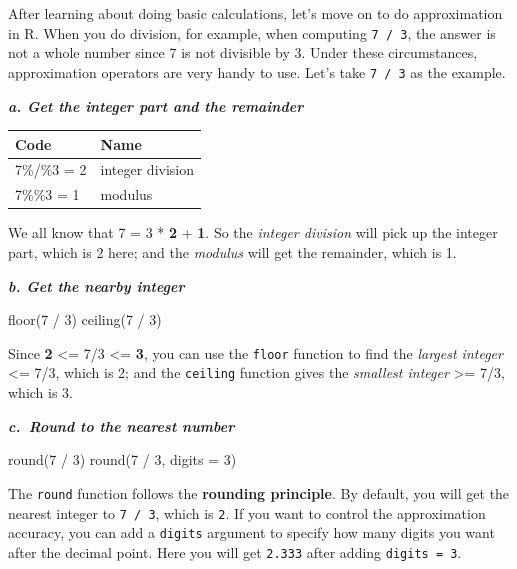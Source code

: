\documentclass[
]{book}
\newenvironment{Shaded}{\begin{snugshade}}{\end{snugshade}}
\newcommand{\AttributeTok}[1]{\textcolor[rgb]{0.77,0.63,0.00}{#1}}
\newcommand{\DecValTok}[1]{\textcolor[rgb]{0.00,0.00,0.81}{#1}}
\newcommand{\FunctionTok}[1]{\textcolor[rgb]{0.00,0.00,0.00}{#1}}
\newcommand{\NormalTok}[1]{#1}
\newcommand{\SpecialCharTok}[1]{\textcolor[rgb]{0.00,0.00,0.00}{#1}}
\begin{document}
After learning about doing basic calculations, let's move on to do approximation in R. When you do division, for example, when computing \texttt{7\ /\ 3}, the answer is not a whole number since 7 is not divisible by 3. Under these circumstances, approximation operators are very handy to use. Let's take \texttt{7\ /\ 3} as the example.

\textbf{\emph{a. Get the integer part and the remainder}}

\begin{tabular}{l|l}
\hline
Code & Name\\
\hline
7\%/\%3 = 2 & integer division\\
\hline
7\%\%3 = 1 & modulus\\
\hline
\end{tabular}

We all know that 7 = 3 * \textbf{2} + \textbf{1}. So the \emph{integer division} will pick up the integer part, which is 2 here; and the \emph{modulus} will get the remainder, which is 1.

\textbf{\emph{b. Get the nearby integer}}

\begin{Shaded}
\begin{Highlighting}[]
\FunctionTok{floor}\NormalTok{(}\DecValTok{7} \SpecialCharTok{/} \DecValTok{3}\NormalTok{)   }
\FunctionTok{ceiling}\NormalTok{(}\DecValTok{7} \SpecialCharTok{/} \DecValTok{3}\NormalTok{) }
\end{Highlighting}
\end{Shaded}

Since \textbf{2} \textless= 7/3 \textless= \textbf{3}, you can use the \texttt{floor} function to find the \emph{largest integer} \textless= 7/3, which is 2; and the \texttt{ceiling} function gives the \emph{smallest integer} \textgreater= 7/3, which is 3.

\textbf{\emph{c.~Round to the nearest number}}

\begin{Shaded}
\begin{Highlighting}[]
\FunctionTok{round}\NormalTok{(}\DecValTok{7} \SpecialCharTok{/} \DecValTok{3}\NormalTok{)   }
\FunctionTok{round}\NormalTok{(}\DecValTok{7} \SpecialCharTok{/} \DecValTok{3}\NormalTok{, }\AttributeTok{digits =} \DecValTok{3}\NormalTok{)}
\end{Highlighting}
\end{Shaded}

The \texttt{round} function follows the \textbf{rounding principle}. By default, you will get the nearest integer to \texttt{7\ /\ 3}, which is \texttt{2}. If you want to control the approximation accuracy, you can add a \texttt{digits} argument to specify how many digits you want after the decimal point. Here you will get \texttt{2.333} after adding \texttt{digits\ =\ 3}.
\end{document}
